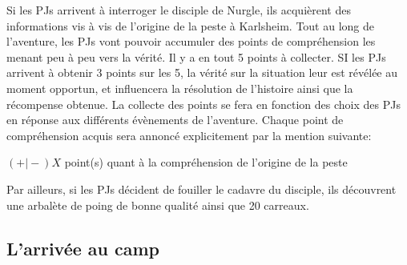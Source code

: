 \documentclass[french,oneside]{wfrp}
\begin{document}
\begin{gamebox}[title={NIVEAU DE COMPRÉHENSION SUR
    L'ORIGINE DE LA PESTE},%
  before upper={\tcbtitle},%
  center title,%
  titlerule=0pt,%
  toptitle=5pt,%
  coltitle=guardsmanred,%
  colbacktitle=gameboxbgcolor,%
  fonttitle=\fontsize{13}{15}\bfseries\selectfont]
 
  Si les PJs arrivent à interroger le disciple de Nurgle, ils
  acquièrent des informations vis à vis de l’origine de la peste à
  Karlsheim. Tout au long de l’aventure, les PJs vont pouvoir
  accumuler des points de compréhension les menant peu à peu vers la
  vérité. Il y a en tout 5 points à collecter. SI les PJs arrivent à
  obtenir 3 points sur les 5, la vérité sur la situation leur est
  révélée au moment opportun, et influencera la résolution de
  l’histoire ainsi que la récompense obtenue. La collecte des points
  se fera en fonction des choix des PJs en réponse aux différents
  évènements de l’aventure. Chaque point de compréhension acquis sera
  annoncé explicitement par la mention suivante:

  {\begin{gamebox}[coltext=guardsmanred] $(+\vert{}-)X$ point(s) quant
      à la compréhension de l’origine de la peste
    \end{gamebox}}
\end{gamebox}

Par ailleurs, si les PJs décident de fouiller le cadavre du disciple,
ils découvrent une arbalète de poing de bonne qualité ainsi que 20
carreaux.

\subsection{L'arrivée au camp}
\label{sec:arrivee-au-camp}
\end{document}
